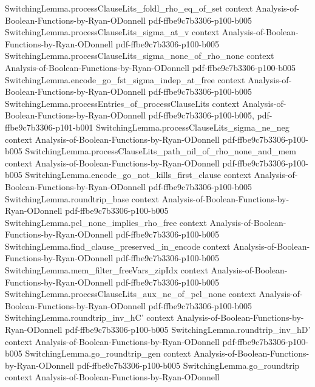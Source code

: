 \begin{theorem}
\proofstep
  {SwitchingLemma.processClauseLits_foldl_rho_eq_of_set}
  {context}
  {Analysis-of-Boolean-Functions-by-Ryan-ODonnell}
  {pdf-ffbe9c7b3306-p100-b005}
\proofstep
  {SwitchingLemma.processClauseLits_sigma_at_v}
  {context}
  {Analysis-of-Boolean-Functions-by-Ryan-ODonnell}
  {pdf-ffbe9c7b3306-p100-b005}
\proofstep
  {SwitchingLemma.processClauseLits_sigma_none_of_rho_none}
  {context}
  {Analysis-of-Boolean-Functions-by-Ryan-ODonnell}
  {pdf-ffbe9c7b3306-p100-b005}
\proofstep
  {SwitchingLemma.encode_go_fst_sigma_indep_at_free}
  {context}
  {Analysis-of-Boolean-Functions-by-Ryan-ODonnell}
  {pdf-ffbe9c7b3306-p100-b005}
\proofstep
  {SwitchingLemma.processEntries_of_processClauseLits}
  {context}
  {Analysis-of-Boolean-Functions-by-Ryan-ODonnell}
  {pdf-ffbe9c7b3306-p100-b005,
    pdf-ffbe9c7b3306-p101-b001}
\proofstep
  {SwitchingLemma.processClauseLits_sigma_ne_neg}
  {context}
  {Analysis-of-Boolean-Functions-by-Ryan-ODonnell}
  {pdf-ffbe9c7b3306-p100-b005}
\proofstep
  {SwitchingLemma.processClauseLits_path_nil_of_rho_none_and_mem}
  {context}
  {Analysis-of-Boolean-Functions-by-Ryan-ODonnell}
  {pdf-ffbe9c7b3306-p100-b005}
\proofstep
  {SwitchingLemma.encode_go_not_kills_first_clause}
  {context}
  {Analysis-of-Boolean-Functions-by-Ryan-ODonnell}
  {pdf-ffbe9c7b3306-p100-b005}
\proofstep
  {SwitchingLemma.roundtrip_base}
  {context}
  {Analysis-of-Boolean-Functions-by-Ryan-ODonnell}
  {pdf-ffbe9c7b3306-p100-b005}
\proofstep
  {SwitchingLemma.pcl_none_implies_rho_free}
  {context}
  {Analysis-of-Boolean-Functions-by-Ryan-ODonnell}
  {pdf-ffbe9c7b3306-p100-b005}
\proofstep
  {SwitchingLemma.find_clause_preserved_in_encode}
  {context}
  {Analysis-of-Boolean-Functions-by-Ryan-ODonnell}
  {pdf-ffbe9c7b3306-p100-b005}
\proofstep
  {SwitchingLemma.mem_filter_freeVars_zipIdx}
  {context}
  {Analysis-of-Boolean-Functions-by-Ryan-ODonnell}
  {pdf-ffbe9c7b3306-p100-b005}
\proofstep
  {SwitchingLemma.processClauseLits_aux_ne_of_pcl_none}
  {context}
  {Analysis-of-Boolean-Functions-by-Ryan-ODonnell}
  {pdf-ffbe9c7b3306-p100-b005}
\proofstep
  {SwitchingLemma.roundtrip_inv_hC'}
  {context}
  {Analysis-of-Boolean-Functions-by-Ryan-ODonnell}
  {pdf-ffbe9c7b3306-p100-b005}
\proofstep
  {SwitchingLemma.roundtrip_inv_hD'}
  {context}
  {Analysis-of-Boolean-Functions-by-Ryan-ODonnell}
  {pdf-ffbe9c7b3306-p100-b005}
\proofstep
  {SwitchingLemma.go_roundtrip_gen}
  {context}
  {Analysis-of-Boolean-Functions-by-Ryan-ODonnell}
  {pdf-ffbe9c7b3306-p100-b005}
\proofstep
  {SwitchingLemma.go_roundtrip}
  {context}
  {Analysis-of-Boolean-Functions-by-Ryan-ODonnell}

\end{theorem}
